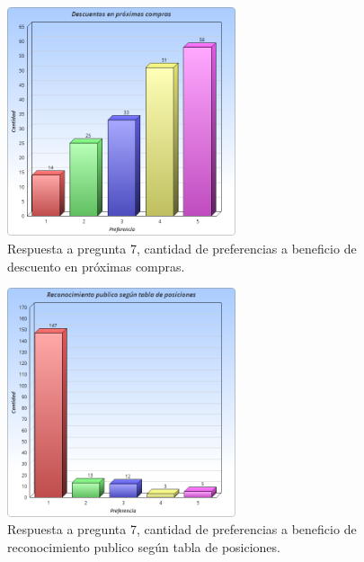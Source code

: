 \begin{figure}[!htb]
  \centering
  \includegraphics[width=0.6\textwidth]{images/Graficos/graf_5_7.png}
  \caption[chart5.7]{Respuesta a pregunta 7, cantidad de preferencias a beneficio de descuento en
próximas compras.}
  \label{fig:chart5.7}
\end{figure}

\begin{figure}[!htb]
  \centering
  \includegraphics[width=0.6\textwidth]{images/Graficos/graf_5_8.png}
  \caption[chart5.8]{Respuesta a pregunta 7, cantidad de preferencias a beneficio de reconocimiento
publico según tabla de posiciones.}
  \label{fig:chart5.8}
\end{figure}

